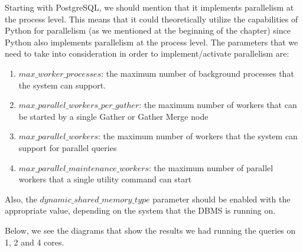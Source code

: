 Starting with PostgreSQL, we should mention that it implements parallelism at the process level. 
This means that it could theoretically utilize the capabilities of Python for parallelism (as we mentioned at the beginning of the chapter) 
since Python also implements parallelism at the process level. The parameters that we need to take into consideration in order to 
implement/activate parallelism are:
\begin{enumerate}
	\item $max\_worker\_processes$: the maximum number of background processes that the system can support.
	\item $max\_parallel\_workers\_per\_gather$: the maximum number of workers that can be started by a single Gather or Gather Merge node
	\item $max\_parallel\_workers$: the maximum number of workers that the system can support for parallel queries
	\item $max\_parallel\_maintenance\_workers$: the maximum number of parallel workers that a single utility command can start
\end{enumerate}
Also, the $dynamic\_shared\_memory\_type$ parameter should be enabled with the appropriate value, depending on the system that the DBMS is running on.

Below, we see the diagrams that show the results we had running the queries on 1, 2 and 4 cores.

